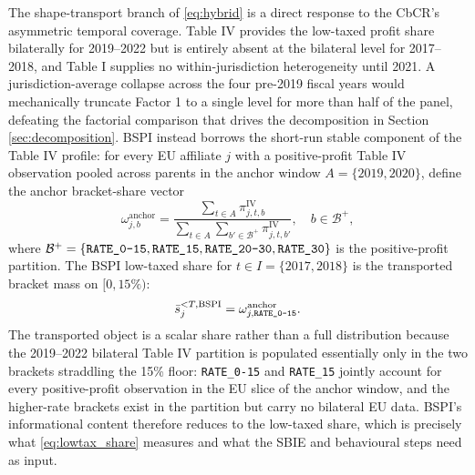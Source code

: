 \documentclass[11pt,a4paper]{article}
\newcommand{\code}[1]{\texttt{#1}}
\begin{document}
The shape-transport branch of \eqref{eq:hybrid} is a direct response to the CbCR's asymmetric temporal coverage. Table IV provides the low-taxed profit share bilaterally for 2019--2022 but is entirely absent at the bilateral level for 2017--2018, and Table I supplies no within-jurisdiction heterogeneity until 2021. A jurisdiction-average collapse across the four pre-2019 fiscal years would mechanically truncate Factor 1 to a single level for more than half of the panel, defeating the factorial comparison that drives the decomposition in Section \ref{sec:decomposition}. BSPI instead borrows the short-run stable component of the Table IV profile: for every EU affiliate $j$ with a positive-profit Table IV observation pooled across parents in the anchor window $A = \{2019, 2020\}$, define the anchor bracket-share vector
\begin{equation}\label{eq:bspi_anchor}
\omega_{j,b}^{\text{anchor}} = \frac{\sum_{t \in A}\pi_{j,t,b}^{\text{IV}}}{\sum_{t \in A}\sum_{b' \in \mathcal{B}^{+}}\pi_{j,t,b'}^{\text{IV}}}, \quad b \in \mathcal{B}^{+},
\end{equation}
where $\mathcal{B}^{+} = \{\code{RATE\_0\text{-}15},\code{RATE\_15},\code{RATE\_20\text{-}30},\code{RATE\_30}\}$ is the positive-profit partition. The BSPI low-taxed share for $t \in I = \{2017, 2018\}$ is the transported bracket mass on $[0, 15\%)$:
\begin{equation}\label{eq:bspi}
\bar{s}_{j}^{<T,\text{BSPI}} = \omega_{j,\code{RATE\_0\text{-}15}}^{\text{anchor}}.
\end{equation}
The transported object is a scalar share rather than a full distribution because the 2019--2022 bilateral Table IV partition is populated essentially only in the two brackets straddling the 15\% floor: \code{RATE\_0-15} and \code{RATE\_15} jointly account for every positive-profit observation in the EU slice of the anchor window, and the higher-rate brackets exist in the partition but carry no bilateral EU data. BSPI's informational content therefore reduces to the low-taxed share, which is precisely what \eqref{eq:lowtax_share} measures and what the SBIE and behavioural steps need as input.
\end{document}
